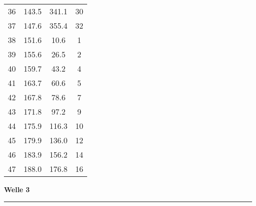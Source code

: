 \documentclass[10pt, a4paper]{article}
\begin{document}
\begin{center}
\begin{tabular}{c|c|c|c}
		36 & 143.5 & 341.1 & 30 \\
		37 & 147.6 & 355.4 & 32 \\
		38 & 151.6 & 10.6 & 1 \\
		39 & 155.6 & 26.5 & 2 \\
		40 & 159.7 & 43.2 & 4 \\
		41 & 163.7 & 60.6 & 5 \\
		42 & 167.8 & 78.6 & 7 \\
		43 & 171.8 & 97.2 & 9 \\
		44 & 175.9 & 116.3 & 10 \\
		45 & 179.9 & 136.0 & 12 \\
		46 & 183.9 & 156.2 & 14 \\
		47 & 188.0 & 176.8 & 16 \\
	\end{tabular}
\end{center}
\newpage
\centerline{{\bf Welle 3} }
\rule{1.0\textwidth}{0.5mm}
\end{document}
